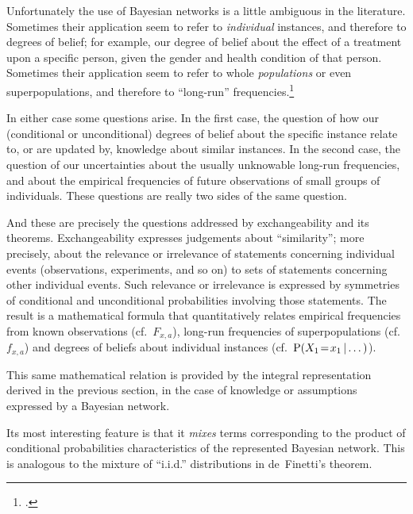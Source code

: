 \documentclass[\ifafour a4paper,12pt,\else a5paper,10pt,\fi%
onecolumn,oneside,article,%
british%
]{memoir}
\theoremstyle{remark}
\theoremstyle{innote}
\newcommand*{\citep}{\footcites}
\newcommand*{\p}{\mathrm{P}}%
\renewcommand*{\|}[1][]{\nonscript\,#1\vert\nonscript\,\mathopen{}}
\newcommand*{\eg}{{e.g.}}
\newcommand*{\cf}{{cf.}}
\renewcommand*{\=}{\TextOrMath\texteq\eq}
\newcommand*{\X}[1]{X_{#1}}
\newcommand*{\x}[1]{x_{#1}}
\begin{document}
Unfortunately the use of Bayesian networks is a little ambiguous in the
literature. Sometimes their application seem to refer to \emph{individual}
instances, and therefore to degrees of belief; for example, our degree of
belief about the effect of a treatment upon a specific person, given the
gender and health condition of that person. Sometimes their application
seem to refer to whole \emph{populations} or even superpopulations, and
therefore to \enquote{long-run}
frequencies.\citep[\eg][]{pearl2000_r2009,wiegerincketal2013}[the
discussion by][is more precise in this respect: they assume, for
simplicity, a limit in which the two problems become numerically
similar]{lindleyetal1981}

In either case some questions arise. In the first case, the question of how
our (conditional or unconditional) degrees of belief about the specific
instance relate to, or are updated by, knowledge about similar instances.
In the second case, the question of our uncertainties about the usually
unknowable long-run frequencies, and about the empirical frequencies of
future observations of small groups of individuals. These questions are
really two sides of the same question.

And these are precisely the questions addressed by exchangeability and its
theorems. Exchangeability expresses judgements about \enquote{similarity};
more precisely, about the relevance or irrelevance of statements concerning
individual events (observations, experiments, and so on) to sets of
statements concerning other individual events. Such relevance or
irrelevance is expressed by symmetries of conditional and unconditional
probabilities involving those statements. The result is a mathematical
formula that quantitatively relates empirical frequencies from known
observations (\cf\ $F_{x,a}$), long-run frequencies of superpopulations
(\cf\ $f_{x,a}$) and degrees of beliefs about individual instances (\cf\
$\p(\X{1}\=\x{1} \| \dotso)$).

This same mathematical relation is provided by the integral representation
derived in the previous section, in the case of knowledge or assumptions
expressed by a Bayesian network.

Its most interesting feature is that it \emph{mixes} terms corresponding to
the product of conditional probabilities characteristics of the represented
Bayesian network. This is analogous to the mixture of \enquote{i.i.d.}
distributions in de~Finetti's theorem.

\end{document}
